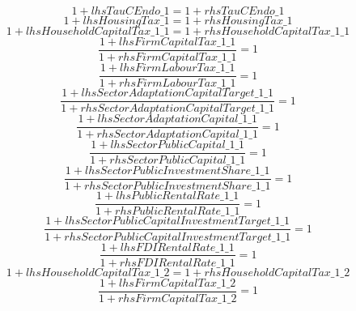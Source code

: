 \begin{dmath}
1+{lhsTauCEndo\_1}=1+{rhsTauCEndo\_1}
\end{dmath}
\begin{dmath}
1+{lhsHousingTax\_1}=1+{rhsHousingTax\_1}
\end{dmath}
\begin{dmath}
1+{lhsHouseholdCapitalTax\_1\_1}=1+{rhsHouseholdCapitalTax\_1\_1}
\end{dmath}
\begin{dmath}
\frac{1+{lhsFirmCapitalTax\_1\_1}}{1+{rhsFirmCapitalTax\_1\_1}}=1
\end{dmath}
\begin{dmath}
\frac{1+{lhsFirmLabourTax\_1\_1}}{1+{rhsFirmLabourTax\_1\_1}}=1
\end{dmath}
\begin{dmath}
\frac{1+{lhsSectorAdaptationCapitalTarget\_1\_1}}{1+{rhsSectorAdaptationCapitalTarget\_1\_1}}=1
\end{dmath}
\begin{dmath}
\frac{1+{lhsSectorAdaptationCapital\_1\_1}}{1+{rhsSectorAdaptationCapital\_1\_1}}=1
\end{dmath}
\begin{dmath}
\frac{1+{lhsSectorPublicCapital\_1\_1}}{1+{rhsSectorPublicCapital\_1\_1}}=1
\end{dmath}
\begin{dmath}
\frac{1+{lhsSectorPublicInvestmentShare\_1\_1}}{1+{rhsSectorPublicInvestmentShare\_1\_1}}=1
\end{dmath}
\begin{dmath}
\frac{1+{lhsPublicRentalRate\_1\_1}}{1+{rhsPublicRentalRate\_1\_1}}=1
\end{dmath}
\begin{dmath}
\frac{1+{lhsSectorPublicCapitalInvestmentTarget\_1\_1}}{1+{rhsSectorPublicCapitalInvestmentTarget\_1\_1}}=1
\end{dmath}
\begin{dmath}
\frac{1+{lhsFDIRentalRate\_1\_1}}{1+{rhsFDIRentalRate\_1\_1}}=1
\end{dmath}
\begin{dmath}
1+{lhsHouseholdCapitalTax\_1\_2}=1+{rhsHouseholdCapitalTax\_1\_2}
\end{dmath}
\begin{dmath}
\frac{1+{lhsFirmCapitalTax\_1\_2}}{1+{rhsFirmCapitalTax\_1\_2}}=1
\end{dmath}
